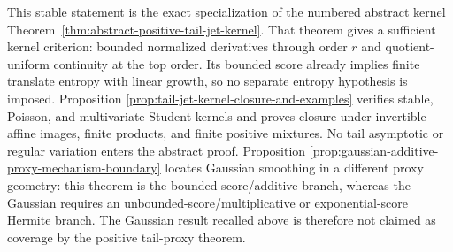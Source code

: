 This stable statement is the exact specialization of the numbered abstract
kernel Theorem~\ref{thm:abstract-positive-tail-jet-kernel}.  That theorem
gives a sufficient kernel criterion: bounded normalized derivatives through
order \(r\) and quotient-uniform continuity at the top order.  Its bounded
score already implies finite translate entropy with linear growth, so no
separate entropy hypothesis is imposed.  Proposition
\ref{prop:tail-jet-kernel-closure-and-examples} verifies stable, Poisson, and
multivariate Student kernels and proves closure under invertible affine
images, finite products, and finite positive mixtures.  No tail asymptotic or
regular variation enters the abstract proof.  Proposition
\ref{prop:gaussian-additive-proxy-mechanism-boundary} locates Gaussian
smoothing in a different proxy geometry: this theorem is the
bounded-score/additive branch, whereas the Gaussian requires an
unbounded-score/multiplicative or exponential-score Hermite branch.  The
Gaussian result recalled above is therefore not claimed as coverage by the
positive tail-proxy theorem.
